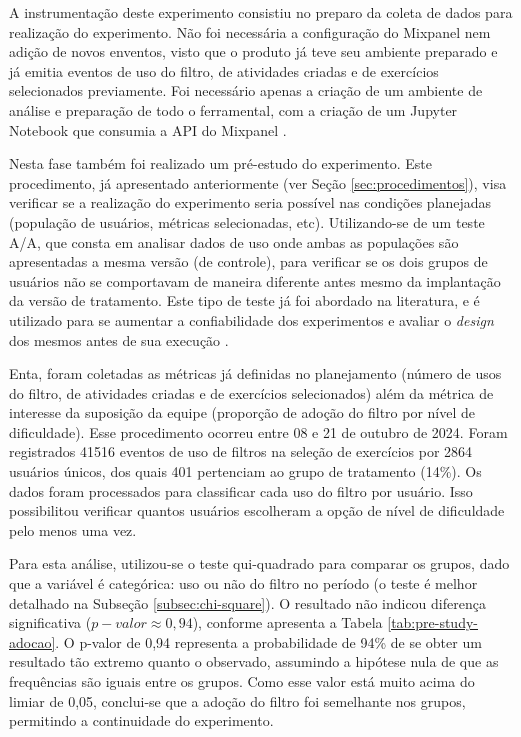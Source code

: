 A instrumentação deste experimento consistiu no preparo da coleta de dados para realização do experimento. Não foi necessária a configuração do Mixpanel \cite{mixpanel2024} nem adição de novos enventos, visto que o produto já teve seu ambiente preparado e já emitia eventos de uso do filtro, de atividades criadas e de exercícios selecionados previamente. Foi necessário apenas a criação de um ambiente de análise e preparação de todo o ferramental, com a criação de um Jupyter Notebook \cite{jupyter_notebook} que consumia a API do Mixpanel \cite{mixpanel2024}.

Nesta fase também foi realizado um pré-estudo do experimento. Este procedimento, já apresentado anteriormente (ver Seção \ref{sec:procedimentos}), visa verificar se a realização do experimento seria possível nas condições planejadas (população de usuários, métricas selecionadas, etc). Utilizando-se de um teste A/A, que consta em analisar dados de uso onde ambas as populações são apresentadas a mesma versão (de controle), para verificar se os dois grupos de usuários não se comportavam de maneira diferente antes mesmo da implantação da versão de tratamento. Este tipo de teste já foi abordado na literatura, e é utilizado para se aumentar a confiabilidade dos experimentos e avaliar o \textit{design} dos mesmos antes de sua execução \cite{fabijan_evolution_2017, fabijan_three_2019, erthal_characterization_2023, fabijan_benefits_2017, crook_seven_2009}.

Enta, foram coletadas as métricas já definidas no planejamento (número de usos do filtro, de atividades criadas e de exercícios selecionados) além da métrica de interesse da suposição da equipe (proporção de adoção do filtro por nível de dificuldade). Esse procedimento ocorreu entre 08 e 21 de outubro de 2024. Foram registrados 41516 eventos de uso de filtros na seleção de exercícios por 2864 usuários únicos, dos quais 401 pertenciam ao grupo de tratamento (14\%). Os dados foram processados para classificar cada uso do filtro por usuário. Isso possibilitou verificar quantos usuários escolheram a opção de nível de dificuldade pelo menos uma vez. 

Para esta análise, utilizou-se o teste qui-quadrado para comparar os grupos, dado que a variável é categórica: uso ou não do filtro no período (o teste é melhor detalhado na Subseção \ref{subsec:chi-square}). O resultado não indicou diferença significativa (\( p-valor \approx 0,94 \)), conforme apresenta a Tabela \ref{tab:pre-study-adocao}.  O p-valor de 0,94 representa a probabilidade de 94\% de se obter um resultado tão extremo quanto o observado, assumindo a hipótese nula de que as frequências são iguais entre os grupos. Como esse valor está muito acima do limiar de 0,05, conclui-se que a adoção do filtro foi semelhante nos grupos, permitindo a continuidade do experimento.  




